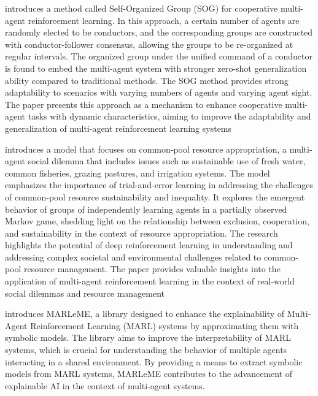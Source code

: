 \documentclass[runningheads]{llncs}
\newcounter{relation}
\begin{document}
\cite{Shao2022} introduces a method called Self-Organized Group (SOG) for cooperative multi-agent reinforcement learning. In this approach, a certain number of agents are randomly elected to be conductors, and the corresponding groups are constructed with conductor-follower consensus, allowing the groups to be re-organized at regular intervals. The organized group under the unified command of a conductor is found to embed the multi-agent system with stronger zero-shot generalization ability compared to traditional methods. The SOG method provides strong adaptability to scenarios with varying numbers of agents and varying agent sight. The paper presents this approach as a mechanism to enhance cooperative multi-agent tasks with dynamic characteristics, aiming to improve the adaptability and generalization of multi-agent reinforcement learning systems

\cite{Perolat2017} introduces a model that focuses on common-pool resource appropriation, a multi-agent social dilemma that includes issues such as sustainable use of fresh water, common fisheries, grazing pastures, and irrigation systems. The model emphasizes the importance of trial-and-error learning in addressing the challenges of common-pool resource sustainability and inequality. It explores the emergent behavior of groups of independently learning agents in a partially observed Markov game, shedding light on the relationship between exclusion, cooperation, and sustainability in the context of resource appropriation. The research highlights the potential of deep reinforcement learning in understanding and addressing complex societal and environmental challenges related to common-pool resource management. The paper provides valuable insights into the application of multi-agent reinforcement learning in the context of real-world social dilemmas and resource management

\cite{Kazhdan2020} introduces MARLeME, a library designed to enhance the explainability of Multi-Agent Reinforcement Learning (MARL) systems by approximating them with symbolic models. The library aims to improve the interpretability of MARL systems, which is crucial for understanding the behavior of multiple agents interacting in a shared environment. By providing a means to extract symbolic models from MARL systems, MARLeME contributes to the advancement of explainable AI in the context of multi-agent systems.
\end{document}
